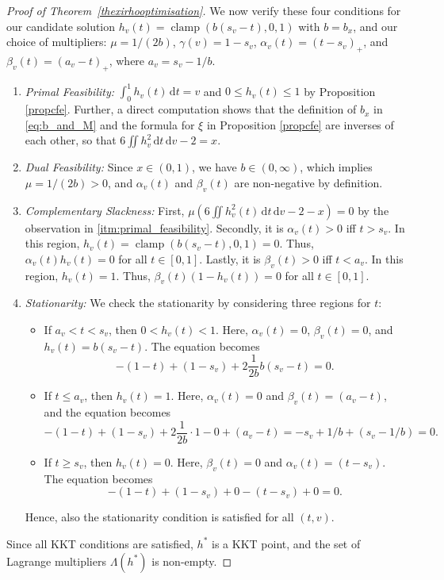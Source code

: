 \documentclass{article}
\theoremstyle{plain}
\theoremstyle{definition}
\newcommand{\de}{\mathrm{\,d}}
\begin{document}
\begin{proof}[Proof of Theorem~\ref{thexirhooptimisation}]
We now verify these four conditions for our candidate solution $h_v(t) = \operatorname{clamp}(b(s_v-t), 0, 1)$ with $b=b_x$, and our choice of multipliers: $\mu = 1/(2b)$, $\gamma(v) = 1-s_v$, $\alpha_v(t) = (t-s_v)_+$, and $\beta_v(t) = (a_v-t)_+$, where $a_v=s_v-1/b$.

\begin{enumerate}[label=(\roman*), font=\upshape]
    \item \label{itm:primal_feasibility}\emph{Primal Feasibility:} $\int_0^1 h_v(t)\de t = v$ and $0 \le h_v(t) \le 1$ by Proposition \ref{propcfe}.
    Further, a direct computation shows that the definition of $b_x$ in \eqref{eq:b_and_M} and the formula for $\xi$ in Proposition \ref{propcfe} are inverses of each other, so that $6\iint h_v^2\de t\de v - 2 = x$.

    \item \emph{Dual Feasibility:} Since $x \in (0,1)$, we have $b \in (0,\infty)$, which implies $\mu = 1/(2b) > 0$, and $\alpha_v(t)$ and $\beta_v(t)$ are non-negative by definition.

    \item \emph{Complementary Slackness:}
        First, $\mu(6\iint h_v^2(t)\de t\de v - 2-x)=0$ by the observation in \eqref{itm:primal_feasibility}.
        Secondly, it is $\alpha_v(t)>0$ iff $t > s_v$. In this region, $h_v(t)=\operatorname{clamp}(b(s_v-t),0,1)=0$.
        Thus, $\alpha_v(t)h_v(t)=0$ for all \(t\in [0,1].\)
        Lastly, it is $\beta_v(t)>0$ iff $t < a_v$.
        In this region, $h_v(t)=1$. Thus, $\beta_v(t)(1-h_v(t))=0$ for all \(t\in [0,1].\)

    \item \emph{Stationarity:} We check the stationarity by considering three regions for $t$:
    \begin{itemize}
        \item If $a_v < t < s_v$, then $0 < h_v(t) < 1$. Here, $\alpha_v(t)=0$, $\beta_v(t)=0$, and $h_v(t)=b(s_v-t)$. The equation becomes
        \[
          -(1-t) + (1-s_v) + 2\frac1{2b}b(s_v-t) = 0.
        \]
        \item If $t \le a_v$, then $h_v(t)=1$. Here, $\alpha_v(t)=0$ and $\beta_v(t)=(a_v-t)$, and the equation becomes
        \[
        -(1-t) + (1-s_v) + 2 \frac1{2b} \cdot 1 - 0 + (a_v-t)
        = -s_v+1/b+(s_v-1/b) 
        = 0.
        \]
        \item If $t \ge s_v$, then $h_v(t)=0$. Here, $\beta_v(t)=0$ and $\alpha_v(t)=(t-s_v)$.
        The equation becomes
        \[
        -(1-t) + (1-s_v) + 0 - (t-s_v) + 0 = 0.
        \]
    \end{itemize}
    Hence, also the stationarity condition is satisfied for all $(t,v)$.
\end{enumerate}
Since all KKT conditions are satisfied, $h^*$ is a KKT point, and the set of Lagrange multipliers $\Lambda(h^*)$ is non-empty.



\end{proof}
\end{document}
